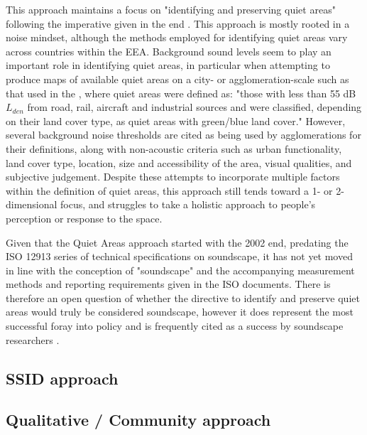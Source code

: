 This approach maintains a focus on "identifying and preserving quiet areas" \citep{EEA2020Environmental} following the imperative given in the \gls{end} \citep{EU2002Directive}. This approach is mostly rooted in a noise mindset, although the methods employed for identifying quiet areas vary across countries within the EEA. Background sound levels seem to play an important role in identifying quiet areas, in particular when attempting to produce maps of available quiet areas on a city- or agglomeration-scale such as that used in the \citet{EEA2020Environmental}, where quiet areas were defined as: "those with less than 55 dB $L_{den}$ from road, rail, aircraft and industrial sources and were classified, depending on their land cover type, as quiet areas with green/blue land cover." However, several background noise thresholds are cited as being used by agglomerations for their definitions, along with non-acoustic criteria such as urban functionality, land cover type, location, size and accessibility of the area, visual qualities, and subjective judgement. %
Despite these attempts to incorporate multiple factors within the definition of quiet areas, this approach still tends toward a 1- or 2-dimensional focus, and struggles to take a holistic approach to people's perception or response to the space.

Given that the Quiet Areas approach started with the 2002 \gls{end}, predating the ISO 12913 series of technical specifications on soundscape, it has not yet moved in line with the conception of "soundscape" and the accompanying measurement methods and reporting requirements given in the ISO documents. There is therefore an open question of whether the directive to identify and preserve quiet areas would truly be considered soundscape, however it does represent the most successful foray into policy and is frequently cited as a success by soundscape researchers .

\subsection{SSID approach}

\subsection{Qualitative / Community approach}

